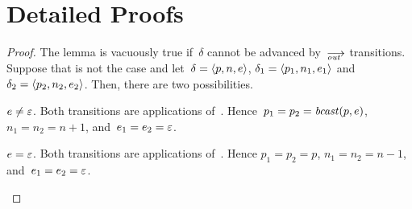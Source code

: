 \section{Detailed Proofs}
\label{sec.proofs}


\lemxdetout*
\begin{proof}
  The lemma is vacuously true if~$\delta$ cannot be advanced by~$\out$
  transitions.  Suppose that is not the case and let~$\delta=\<p,n,e>$,
  $\delta_1=\<p_1,n_1,e_1>$ and~$\delta_2=\<p_2,n_2,e_2>$.  Then, there are
  two possibilities.
  \begin{case}
  \item $e\ne\varepsilon$.  Both transitions are applications of~.
    Hence~$p_1=p_2=\operatorname{\mathit{bcast}}(p,e)$, $n_1=n_2=n+1$, and~$e_1=e_2=\varepsilon$.
  \item $e=\varepsilon$.  Both transitions are applications of~.
    Hence $p_1=p_2=p$, $n_1=n_2=n-1$, and~$e_1=e_2=\varepsilon$.\qedhere
  \end{case}
\end{proof}

